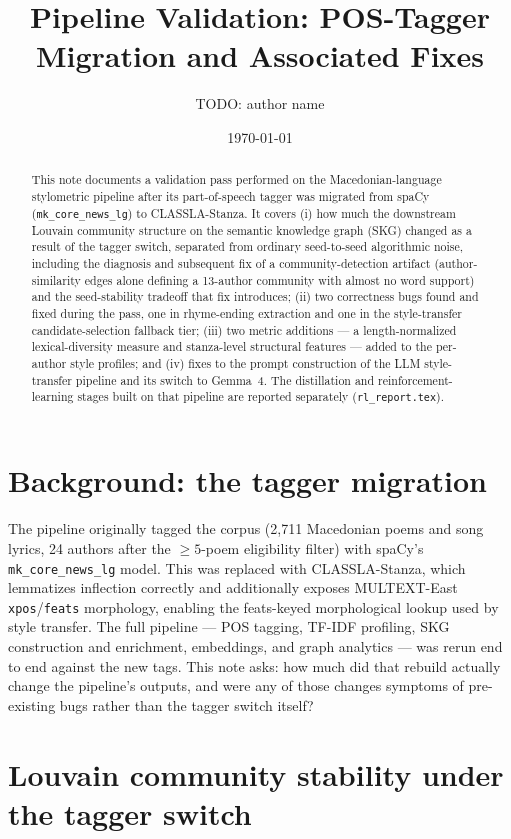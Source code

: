 \documentclass[11pt]{article}
\title{Pipeline Validation: POS-Tagger Migration and Associated Fixes}
\author{TODO: author name}
\date{\today}
\begin{document}
\maketitle

\begin{abstract}
This note documents a validation pass performed on the Macedonian-language
stylometric pipeline after its part-of-speech tagger was migrated from spaCy
(\texttt{mk\_core\_news\_lg}) to CLASSLA-Stanza. It covers (i) how much the
downstream Louvain community structure on the semantic knowledge graph (SKG)
changed as a result of the tagger switch, separated from ordinary
seed-to-seed algorithmic noise, including the diagnosis and subsequent fix
of a community-detection artifact (author-similarity edges alone defining a
13-author community with almost no word support) and the seed-stability
tradeoff that fix introduces; (ii) two correctness bugs found and fixed
during the pass, one in rhyme-ending extraction and one in the style-transfer
candidate-selection fallback tier; (iii) two metric additions — a
length-normalized lexical-diversity measure and stanza-level structural
features — added to the per-author style profiles; and
(iv) fixes to the prompt construction of the LLM style-transfer pipeline and
its switch to Gemma~4. The distillation and reinforcement-learning stages
built on that pipeline are reported separately (\texttt{rl\_report.tex}).
\end{abstract}

\section{Background: the tagger migration}

The pipeline originally tagged the corpus (2{,}711 Macedonian poems and song
lyrics, 24 authors after the $\geq 5$-poem eligibility filter) with spaCy's
\texttt{mk\_core\_news\_lg} model. This was replaced with CLASSLA-Stanza,
which lemmatizes inflection correctly and additionally exposes MULTEXT-East
\texttt{xpos}/\texttt{feats} morphology, enabling the feats-keyed
morphological lookup used by style transfer. The full pipeline — POS
tagging, TF-IDF profiling, SKG construction and enrichment, embeddings, and
graph analytics — was rerun end to end against the new tags. This note asks:
how much did that rebuild actually change the pipeline's outputs, and were
any of those changes symptoms of pre-existing bugs rather than the tagger
switch itself?

\section{Louvain community stability under the tagger switch}
\label{sec:louvain}
\end{document}
